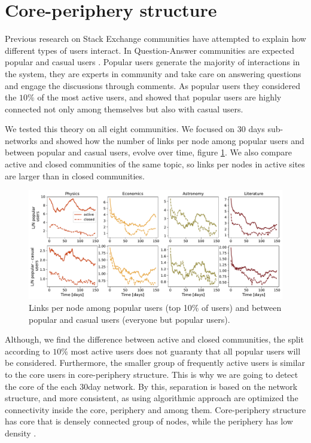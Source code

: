 \section{Core-periphery structure}

Previous research on Stack Exchange communities have attempted to explain how different types of users interact. In Question-Answer communities are expected popular and casual users \cite{santos2019activity, santos2019self}. Popular users generate the majority of interactions in the system, they are experts in community and take care on answering questions and engage the discussions through comments. As popular users they considered the $10 \%$ of the most active users, and showed that popular users are highly connected not only among themselves but also with casual users.

We tested this theory on all eight communities. We focused on 30 days sub-networks and showed how the number of links per node among popular users and between popular and casual users, evolve over time, figure \ref{fig:pop_cas_users}. We also compare active and closed communities of the same topic, so links per nodes in active sites are larger than in closed communities.

\begin{figure}[h!]
	\centering
	\includegraphics[width=\linewidth]{figures/stackexchange/popular_casual_users.pdf}
	\caption{Links per node among popular users (top 10\% of users) and between popular and casual users (everyone but popular users).}
	\label{fig:pop_cas_users}
\end{figure} 

Although, we find the difference between active and closed communities, the split according to $10\%$  most active users does not guaranty that all popular users will be considered. Furthermore, the smaller group of frequently active users is similar to the core users in core-periphery structure. This is why we are going to detect the core of the each 30day network. By this, separation is based on the network structure, and more consistent, as using algorithmic approach are optimized the connectivity inside the core, periphery and among them. Core-periphery structure has core that is densely connected group of nodes, while the periphery has low density \cite{fortunato2010community, gallagher2020clarified}. 

